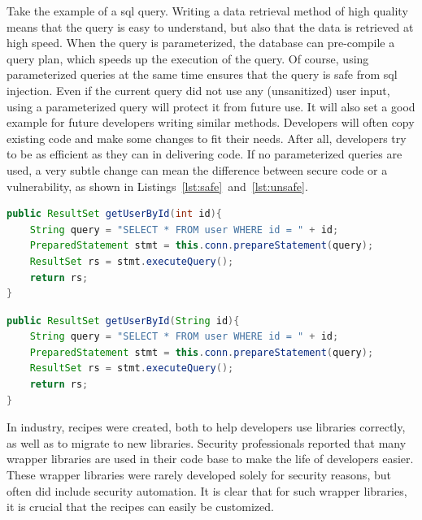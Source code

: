 Take the example of a \gls{sql} query.
Writing a data retrieval method of high quality means that the query is easy to understand, but also that the data is retrieved at high speed.
When the query is parameterized, the database can pre-compile a query plan, which speeds up the execution of the query.
Of course, using parameterized queries at the same time ensures that the query is safe from \gls{sql} injection.
Even if the current query did not use any (unsanitized) user input, using a parameterized query will protect it from future use.
It will also set a good example for future developers writing similar methods.
Developers will often copy existing code and make some changes to fit their needs.
After all, developers try to be as efficient as they can in delivering code.
If no parameterized queries are used, a very subtle change can mean the difference between secure code or a vulnerability, as shown in Listings~\ref{lst:safe}~and~\ref{lst:unsafe}.

\begin{lstlisting}[float,language={Java},caption={This method concatenates an integer value to the query. An integer variable can not alter the query, and hence this method can not lead to SQL injection.},
float,label={lst:safe},abovecaptionskip=-0.0pt]
public ResultSet getUserById(int id){
    String query = "SELECT * FROM user WHERE id = " + id;
    PreparedStatement stmt = this.conn.prepareStatement(query);
    ResultSet rs = stmt.executeQuery();
    return rs;
}
\end{lstlisting}

\begin{lstlisting}[language={Java},caption={This method concatenates a String variable to the query. As a result it is vulnerable to SQL injection.}, float,label={lst:unsafe},abovecaptionskip=-0.0pt]
public ResultSet getUserById(String id){
    String query = "SELECT * FROM user WHERE id = " + id;
    PreparedStatement stmt = this.conn.prepareStatement(query);
    ResultSet rs = stmt.executeQuery();
    return rs;
}
\end{lstlisting}

In industry, recipes were created, both to help developers use libraries correctly, as well as to migrate to new libraries.
Security professionals reported that many wrapper libraries are used in their code base to make the life of developers easier.
These wrapper libraries were rarely developed solely for security reasons, but often did include security automation.
It is clear that for such wrapper libraries, it is crucial that the recipes can easily be customized.

